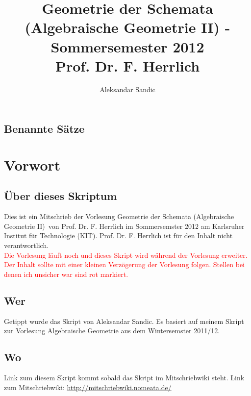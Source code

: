 \documentclass[a4paper,12pt]{report}
\title{Geometrie der Schemata (Algebraische Geometrie II)  - Sommersemester 2012\\ Prof. Dr. F. Herrlich}
\author{Aleksandar Sandic}
\theoremstyle{break}
\theoremstyle{nonumberbreak}
\theoremstyle{nonumberplain}
\begin{document}
\maketitle

\setlength\parskip{0.6pt}
\tableofcontents

\section*{Benannte S\"atze}


\setlength\parskip{\smallskipamount}



\chapter{Vorwort}
\setcounter{secnumdepth}{2}
\section*{\"Uber dieses Skriptum}
Dies ist ein Mitschrieb der Vorlesung \glqq Geometrie der Schemata (Algebraische Geometrie II)\grqq\ von Prof. Dr. F. Herrlich im Sommersemster 2012 am Karlsruher Institut f\"ur Technologie (KIT). Prof. Dr. F. Herrlich ist f\"ur  den Inhalt nicht verantwortlich.\\
\textcolor{red}{Die Vorlesung l\"auft noch und dieses Skript wird w\"ahrend der Vorlesung erweiter. Der Inhalt sollte mit einer kleinen Verz\"ogerung der Vorlesung folgen. Stellen bei denen ich unsicher war sind rot markiert.}
\section*{Wer}
Getippt wurde das Skript von Aleksandar Sandic. Es basiert auf meinem Skript zur Vorlesung Algebraische Geometrie aus dem Wintersemster 2011/12.

\section*{Wo}
Link zum diesem Skript kommt sobald das Skript im Mitschriebwiki steht.
Link zum Mitschriebwiki: \url{http://mitschriebwiki.nomeata.de/}
\end{document}
